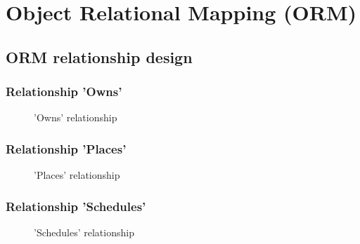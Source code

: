 
\chapter{Object Relational Mapping (ORM)}
\label{chap:orm}


\section{ORM relationship design}
\label{sec:rel_design}

\subsection*{Relationship 'Owns'}

\begin{minipage}[h]{0.5\textwidth}
    \begin{figure}[H]
        
        \caption{'Owns' relationship}
        \label{fig:orm_u_sac}
    \end{figure}
\end{minipage}
\hfill
\begin{minipage}[h]{0.45\textwidth}
    \blindtext
\end{minipage}

\subsection*{Relationship 'Places'}

\begin{minipage}[h]{0.5\textwidth}
    \begin{figure}[H]
        
        \caption{'Places' relationship}
        \label{fig:orm_u_o}
    \end{figure}
\end{minipage}
\hfill
\begin{minipage}[h]{0.45\textwidth}
    \blindtext
\end{minipage}

\subsection*{Relationship 'Schedules'}

\begin{minipage}[h]{0.5\textwidth}
    \begin{figure}[H]
        
        \caption{'Schedules' relationship}
        \label{fig:orm_sac_o}
    \end{figure}
\end{minipage}
\hfill
\begin{minipage}[h]{0.45\textwidth}
    \blindtext
\end{minipage}

